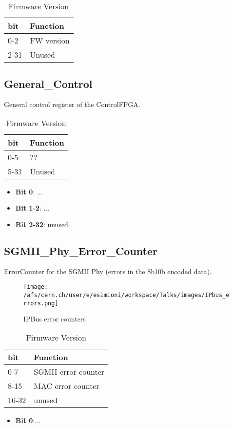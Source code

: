 \begin {table}[H]
\begin{center}
\caption {Firmware Version}
\label{reg_4}
\begin{tabular}{|l|l|}
\hline
\textbf{bit} & \textbf{Function} \\
\hline
0-2 & FW version \\
\hline
2-31& Unused  \\
\hline
\end{tabular}
\end{center}
\end{table}



\subsection{General\_Control}
General control register of the ControlFPGA.

\begin {table}[H]
\begin{center}
\caption {Firmware Version}
\label{reg_4}
\begin{tabular}{|l|l|}
\hline
\textbf{bit} & \textbf{Function} \\
\hline
0-5 & ?? \\
\hline
5-31& Unused  \\
\hline
\end{tabular}
\end{center}
\end{table}
%
\begin{itemize}
\item \textbf{Bit 0}: ...
\item \textbf{Bit 1-2}: ...
\item \textbf{Bit 2-32}: unused
\end{itemize}


\subsection{SGMII\_Phy\_Error\_Counter}
ErrorCounter for the SGMII Phy (errors in the 8b10b encoded data).
%
\begin{figure}[H]
    \centering
    \texttt{[image: /afs/cern.ch/user/e/esimioni/workspace/Talks/images/IPbus\_errors.png]}
    \caption{IPBus error counters}
    \label{IPB_err}
\end{figure}
%
\begin {table}[H]
\begin{center}
\caption {Firmware Version}
\label{reg_4}
\begin{tabular}{|l|l|}
\hline
\textbf{bit} & \textbf{Function} \\
\hline
0-7 & SGMII error counter\\
\hline
8-15 & MAC error counter \\
\hline
16-32 & unused \\
\end{tabular}
\end{center}
\end{table}
%
\begin{itemize}
\item \textbf{Bit 0}:...
\end{itemize}
%
